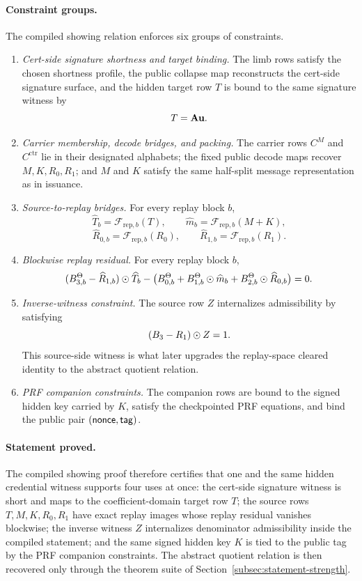 \paragraph{Constraint groups.}
The compiled showing relation enforces six groups of constraints.
\begin{enumerate}[leftmargin=1.25em]
    \item \emph{Cert-side signature shortness and target binding.} The limb rows satisfy the chosen shortness profile,
    the public collapse map reconstructs the cert-side signature surface, and the hidden target row \(T\) is bound to the
    same signature witness by
    \[
    T = \mathbf{A}\mathbf{u}.
    \]
    \item \emph{Carrier membership, decode bridges, and packing.} The carrier rows \(C^M\) and
    \(C^{\mathrm{ctr}}\) lie in their designated alphabets; the fixed public decode maps recover \(M,K,R_0,R_1\);
    and \(M\) and \(K\) satisfy the same half-split message representation as in issuance.
    \item \emph{Source-to-replay bridges.} For every replay block \(b\),
    \[
    \widehat T_b = \mathcal F_{\mathrm{rep},b}(T),
    \qquad
    \widehat m_b = \mathcal F_{\mathrm{rep},b}(M+K),
    \]
    \[
    \widehat R_{0,b} = \mathcal F_{\mathrm{rep},b}(R_0),
    \qquad
    \widehat R_{1,b} = \mathcal F_{\mathrm{rep},b}(R_1).
    \]
    \item \emph{Blockwise replay residual.} For every replay block \(b\),
    \[
    (B_{3,b}^\Theta-\widehat R_{1,b})\odot \widehat T_b
    -
    \bigl(B_{0,b}^\Theta + B_{1,b}^\Theta\odot \widehat m_b + B_{2,b}^\Theta\odot \widehat R_{0,b}\bigr)
    =0.
    \]
    \item \emph{Inverse-witness constraint.} The source row \(Z\) internalizes admissibility by satisfying
    \[
    (B_3-R_1)\odot Z = 1.
    \]
    This source-side witness is what later upgrades the replay-space cleared identity to the abstract quotient relation.
    \item \emph{PRF companion constraints.} The companion rows are bound to the signed hidden key carried by \(K\),
    satisfy the checkpointed PRF equations, and bind the public pair \((\mathsf{nonce},\mathsf{tag})\).
\end{enumerate}

\paragraph{Statement proved.}
The compiled showing proof therefore certifies that one and the same hidden credential witness supports four uses at
once: the cert-side signature witness is short and maps to the coefficient-domain target row \(T\); the source rows
\(T,M,K,R_0,R_1\) have exact replay images whose replay residual vanishes blockwise; the inverse witness \(Z\)
internalizes denominator admissibility inside the compiled statement; and the same signed hidden key \(K\)
is tied to the public tag by the PRF companion constraints. The abstract quotient relation is then recovered only through
the theorem suite of Section~\ref{subsec:statement-strength}.

